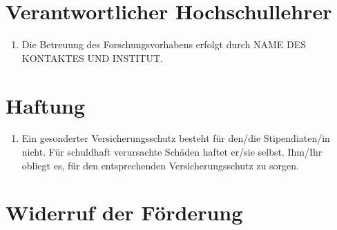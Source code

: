 \documentclass[
  paper=a4,
  fontsize=12pt,
  DIV=16,
  parskip=full,
  headinclude=true,
]{scrartcl}
\newcommand\stipbetreuung{NAME DES KONTAKTES UND INSTITUT}	%
\begin{document}
\section{Verantwortlicher Hochschullehrer}

\begin{enumerate}[\qquad(1)]
	\item Die Betreuung des Forschungsvorhabens erfolgt durch \stipbetreuung.
\end{enumerate}

\section{Haftung}

\begin{enumerate}[\qquad(1)]
	\item Ein gesonderter Versicherungsschutz besteht für den/die
		Stipendiaten/in nicht.
		Für schuldhaft verursachte Schäden haftet er/sie selbst.
		Ihm/Ihr obliegt es, für den entsprechenden Versicherungsschutz
		zu sorgen.
\end{enumerate}

\section{Widerruf der Förderung}
\end{document}
